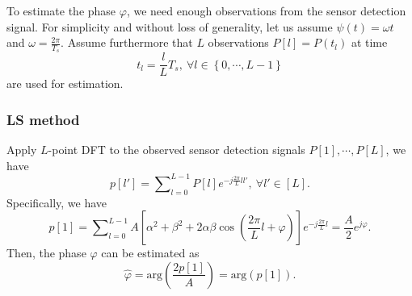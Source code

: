\documentclass[12pt,draftclsnofoot,journal,onecolumn]{IEEEtran}
\theoremstyle{nonumberplain}
\def \arg {\text{arg}}
\begin{document}
To estimate the phase $\varphi$, we need enough observations from the sensor detection signal. For simplicity and without loss of generality, let us assume $\psi(t)=\omega t$ and $\omega=\frac{2\pi}{T_{s}}$. Assume furthermore that $L$ observations $P[l]=P(t_{l})$ at time 
\begin{equation}
\label{observation time}
t_{l}=\frac{l}{L}T_{s},~\forall l\in \left\{0,\cdots ,L-1\right\}
\end{equation}
are used for estimation.
\subsubsection{LS method}
Apply $L$-point \ac{DFT} to the observed sensor detection signals $P[1],\cdots ,P[L]$, we have
\begin{equation}
\label{DFT}
p[l']=\sum\nolimits_{l=0}^{L-1}P[l]e^{-j\frac{2\pi}{L}ll'},~\forall l'\in [L].
\end{equation}
Specifically, we have
\begin{equation}
\label{DFT l=1}
p[1]=\sum\nolimits_{l=0}^{L-1}A\left[\alpha^{2}+\beta^{2}+2\alpha\beta\cos\left(\frac{2\pi}{L}l+\varphi\right)\right]e^{-j\frac{2\pi}{L}l}=\frac{A}{2}e^{j\varphi}.
\end{equation}
Then, the phase $\varphi$ can be estimated as
\begin{equation}
\label{LS estimate result}
\hat{\varphi}=\arg\left(\frac{2p[1]}{A}\right) = \arg\left(p[1]\right).
\end{equation}

\end{document}

